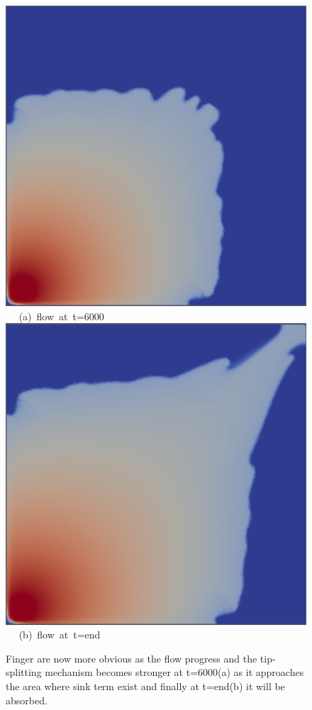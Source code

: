 \begin{figure}[ht]
\vbox{
\hbox{\hspace{3.5cm}
\includegraphics[width=.5\textwidth]{./Pics1/Saffman_homogeneous/saffman_homo_fixed_6000.pdf} 
}
\vspace{0.0cm}
\hbox{\hspace{5.0cm} (a) flow at t=6000   
}
\vspace{0.25cm}
\hbox{\hspace{3.5cm}
\includegraphics[width=.5\textwidth]{./Pics1/Saffman_homogeneous/saffman_homo_fixed_end_1.pdf}
}
\vspace{0.0cm}
\hbox{\hspace{5.0cm} (b) flow at t=end   
}
}     
\caption{Finger are now more obvious as the flow progress and the tip-splitting mechanism becomes stronger at t=6000(a) as it approaches the area where sink term exist and finally at t=end(b) it will be absorbed.}
\label{fig:2c_homoheleshaw_10}
\end{figure}



